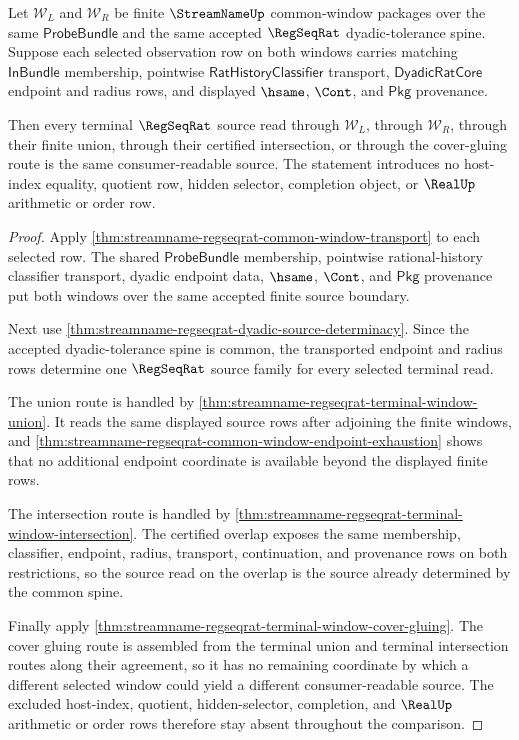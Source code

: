 \begin{theorem}
\label{thm:streamname-regseqrat-common-window-selection-determinacy}
Let $\mathcal W_L$ and $\mathcal W_R$ be finite $\StreamNameUp$ common-window
packages over the same $\mathsf{ProbeBundle}$ and the same accepted
$\RegSeqRat$ dyadic-tolerance spine. Suppose each selected observation row on
both windows carries matching $\mathsf{InBundle}$ membership, pointwise
$\mathsf{RatHistoryClassifier}$ transport, $\mathsf{DyadicRatCore}$ endpoint
and radius rows, and displayed $\hsame$, $\Cont$, and $\mathsf{Pkg}$
provenance.

Then every terminal $\RegSeqRat$ source read through $\mathcal W_L$, through
$\mathcal W_R$, through their finite union, through their certified
intersection, or through the cover-gluing route is the same consumer-readable
source. The statement introduces no host-index equality, quotient row, hidden
selector, completion object, or $\RealUp$ arithmetic or order row.
\end{theorem}
\begin{proof}
Apply \autoref{thm:streamname-regseqrat-common-window-transport} to each
selected row. The shared $\mathsf{ProbeBundle}$ membership, pointwise
rational-history classifier transport, dyadic endpoint data, $\hsame$,
$\Cont$, and $\mathsf{Pkg}$ provenance put both windows over the same accepted
finite source boundary.

Next use \autoref{thm:streamname-regseqrat-dyadic-source-determinacy}. Since
the accepted dyadic-tolerance spine is common, the transported endpoint and
radius rows determine one $\RegSeqRat$ source family for every selected
terminal read.

The union route is handled by
\autoref{thm:streamname-regseqrat-terminal-window-union}. It reads the same
displayed source rows after adjoining the finite windows, and
\autoref{thm:streamname-regseqrat-common-window-endpoint-exhaustion} shows that
no additional endpoint coordinate is available beyond the displayed finite
rows.

The intersection route is handled by
\autoref{thm:streamname-regseqrat-terminal-window-intersection}. The certified
overlap exposes the same membership, classifier, endpoint, radius, transport,
continuation, and provenance rows on both restrictions, so the source read on
the overlap is the source already determined by the common spine.

Finally apply
\autoref{thm:streamname-regseqrat-terminal-window-cover-gluing}. The cover
gluing route is assembled from the terminal union and terminal intersection
routes along their agreement, so it has no remaining coordinate by which a
different selected window could yield a different consumer-readable source.
The excluded host-index, quotient, hidden-selector, completion, and
$\RealUp$ arithmetic or order rows therefore stay absent throughout the
comparison.
\end{proof}


